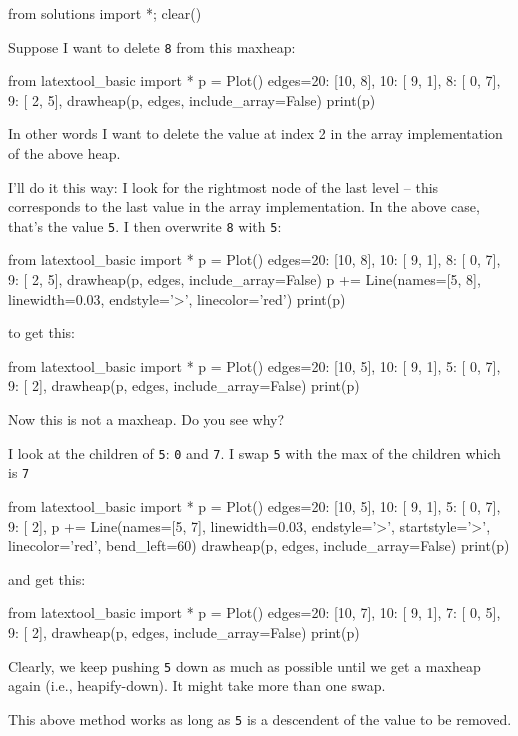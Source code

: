 \begin{python0}
  from solutions import *; clear()
\end{python0}

Suppose I want to delete
\texttt{8}
from this maxheap:


from latextool_basic import *
p = Plot()
edges={20: [10, 8],
10: [ 9, 1],
8: [ 0, 7],
9: [ 2, 5],
}
drawheap(p, edges, include_array=False)
print(p)

In other words I want to delete the value at index 2
in the array implementation of the above heap.

I'll do it this way:
I look for the rightmost node of the last level --
this corresponds to the last value in the array implementation.
In the above case, that's the value \texttt{5}.
I then overwrite \texttt{8} with \texttt{5}:


from latextool_basic import *
p = Plot()
edges={20: [10, 8],
10: [ 9, 1],
8: [ 0, 7],
9: [ 2, 5],
}
drawheap(p, edges, include_array=False)
p += Line(names=[5, 8], linewidth=0.03, endstyle='>', linecolor='red')
print(p)

to get this:


from latextool_basic import *
p = Plot()
edges={20: [10, 5],
10: [ 9, 1],
5: [ 0, 7],
9: [ 2],
}
drawheap(p, edges, include_array=False)
print(p)

Now this is not a maxheap. Do you see why?

I look at the children of \texttt{5}: \texttt{0} and \texttt{7}.
I swap \texttt{5} with the max of the children which is \texttt{7}


from latextool_basic import *
p = Plot()
edges={20: [10, 5],
10: [ 9, 1],
5: [ 0, 7],
9: [ 2],
}
p += Line(names=[5, 7], linewidth=0.03, endstyle='>',
startstyle='>', linecolor='red', bend_left=60)
drawheap(p, edges, include_array=False)
print(p)

and get this:


from latextool_basic import *
p = Plot()
edges={20: [10, 7],
10: [ 9, 1],
7: [ 0, 5],
9: [ 2],
}
drawheap(p, edges, include_array=False)
print(p)

Clearly, we keep pushing \texttt{5} down as much as possible until
we get a maxheap again (i.e., heapify-down).
It might take more than one swap.

This above method works as long as \texttt{5} is a descendent of the
value to be removed.


